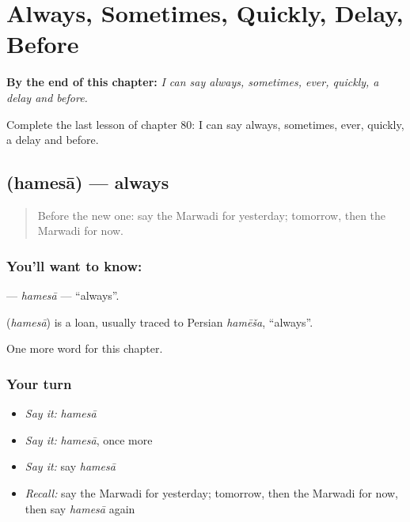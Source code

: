 
\chapter{Always, Sometimes, Quickly, Delay, Before}
\label{ch:mw-always-sometimes-quickly-delay-before}

\begin{chapteropening}
\textbf{By the end of this chapter:} \emph{I can say always, sometimes, ever, quickly, a delay and before.}

Complete the last lesson of chapter 80: I can say always, sometimes, ever, quickly, a delay and before.
\end{chapteropening}

\section[\texorpdfstring{\mw{हमेसा} (hamesā)}{हमेसा (hamesā)}]{ (hamesā) — always}

\label{lesson:MW-C80-hamesa}



\begin{quote}
Before the new one: say the Marwadi for yesterday; tomorrow, then the Marwadi for now.
\end{quote}

\subsection*{You'll want to know: }
\textbf{} — \emph{hamesā} — \textquotedblleft{}always\textquotedblright{}.

\begin{cousinweb}
\textbf{} (\emph{hamesā}) is a loan, usually traced to Persian \emph{hamēša}, \textquotedblleft{}always\textquotedblright{}.
\end{cousinweb}

\begin{grammarlens}[title={What you've built}]
One more word for this chapter.
\end{grammarlens}

\subsection*{Your turn}
\begin{itemize}
\raggedright
  \item \emph{Say it:} \emph{hamesā}
  \item \emph{Say it:} \emph{hamesā}, once more
  \item \emph{Say it:} say \emph{hamesā}
  \item \emph{Recall:} say the Marwadi for yesterday; tomorrow, then the Marwadi for now, then say \emph{hamesā} again
\end{itemize}

